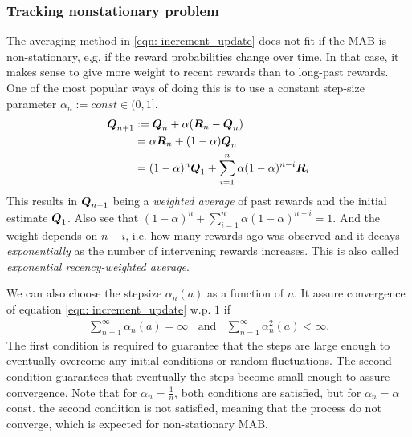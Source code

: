 \documentclass[11pt]{article}
\begin{document}
\subsubsection{Tracking nonstationary problem}
The averaging method in \eqref{eqn: increment_update} does not fit if the MAB is non-stationary, e,g, if the reward probabilities change over time. In that case, it makes sense to give more weight to recent rewards than to long-past rewards. One of the most popular ways
of doing this is to use a constant step-size parameter $\alpha_n := const \in (0,1]. \;\; $
\begin{align}
\boldsymbol{Q}_{n+1} &:= \boldsymbol{Q}_{n} + \alpha(\boldsymbol{R}_n - \boldsymbol{Q}_n)\;\;\nonumber\\
&= \alpha\boldsymbol{R}_n + (1-\alpha) \boldsymbol{Q}_n\;\;\nonumber\\
&= (1-\alpha)^{n}\boldsymbol{Q}_1 + \sum_{i=1}^{n}\alpha(1-\alpha)^{n-i} \boldsymbol{R}_i
\end{align} This results in $\boldsymbol{Q}_{n+1}$ being a \emph{weighted average} of past rewards and the initial estimate $\boldsymbol{Q}_1$. Also see that $(1-\alpha)^{n} + \sum_{i=1}^{n}\alpha(1-\alpha)^{n-i}  = 1$. And the weight depends on $n-i$, i.e. how many rewards ago was observed and it decays \emph{exponentially} as the number of intervening rewards increases. This is also called \emph{exponential recency-weighted average}. 

We can also choose the stepsize $\alpha_n(a)$ as a function of $n$. It assure convergence of equation \eqref{eqn: increment_update} w.p. $1$  if 
\begin{align*}
\sum_{n=1}^{\infty}\alpha_n(a) = \infty \;\; \text{ and }\;\; \sum_{n=1}^{\infty}\alpha^{2}_n(a) < \infty.
\end{align*} The first condition is required to guarantee that the steps are large enough to eventually overcome any initial conditions or random 
fluctuations. The second condition guarantees that eventually the steps become small enough to assure convergence. Note that for $\alpha_n = \frac{1}{n}$, both conditions are satisfied, but for $\alpha_n = \alpha$ const. the second condition is not satisfied, meaning that the process do not converge, which is expected for non-stationary MAB. 

\newpage


\end{document}
